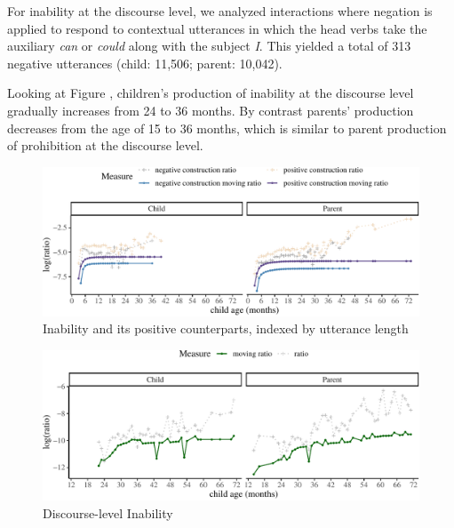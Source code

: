 \documentclass[
  english,
  man,floatsintext]{apa6}
\begin{document}
For inability at the discourse level, we analyzed interactions where negation is applied to respond to contextual utterances in which the head verbs take the auxiliary \emph{can} or \emph{could} along with the subject \emph{I}. This yielded a total of 313 negative utterances (child: 11,506; parent: 10,042).

Looking at Figure , children's production of inability at the discourse level gradually increases from 24 to 36 months. By contrast parents' production decreases from the age of 15 to 36 months, which is similar to parent production of prohibition at the discourse level.

\begin{figure}[H]

{\centering \includegraphics{neg_construction_article_files/figure-latex/inabilityul-1} 

}

\caption{Inability and its positive counterparts, indexed by utterance length}\label{fig:inabilityul}
\end{figure}

\begin{figure}[H]

{\centering \includegraphics{neg_construction_article_files/figure-latex/inabilitydiscourse-1} 

}

\caption{Discourse-level Inability}\label{fig:inabilitydiscourse}
\end{figure}
\end{document}
